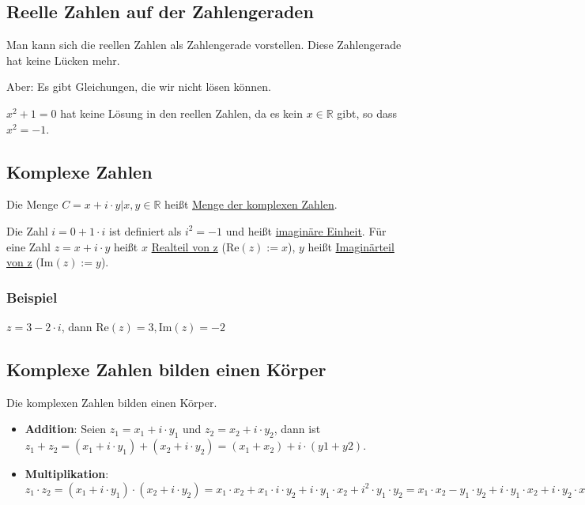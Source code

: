 \subsection{Reelle Zahlen auf der Zahlengeraden}
Man kann sich die reellen Zahlen als Zahlengerade vorstellen. Diese Zahlengerade hat keine Lücken mehr.

\begin{center}
\end{center}

Aber: Es gibt Gleichungen, die wir nicht lösen können.

$x^2 + 1 = 0$ hat keine Lösung in den reellen Zahlen, da es kein $x \in \mathbb{R}$ gibt, so dass $x^2 = -1$.

\subsection{Komplexe Zahlen}
Die Menge $C = {x + i\cdot y | x, y \in \mathbb{R}}$ heißt \underline{Menge der komplexen Zahlen}.

Die Zahl $i = 0 + 1\cdot i$ ist definiert als $i^2 = -1$ und heißt \underline{imaginäre Einheit}. Für eine Zahl $z = x + i\cdot y$ heißt $x$ \underline{Realteil von z} ($\text{Re}(z) := x$), $y$ heißt \underline{Imaginärteil von z} ($\text{Im}(z) := y$).

\subsubsection{Beispiel}
$z = 3 - 2\cdot i$, dann $\text{Re}(z) = 3, \text{Im}(z) = -2$

\subsection{Komplexe Zahlen bilden einen Körper}
Die komplexen Zahlen bilden einen Körper.

\begin{itemize}
\item{\textbf{Addition}: Seien $z_1 = x_1 + i \cdot y_1$ und $z_2 = x_2 + i \cdot y_2$, dann ist $z_1 + z_2 = (x_1 + i \cdot y_1) + (x_2 + i \cdot y_2) = (x_1 + x_2) + i \cdot (y1 + y2)$.}
\item{\textbf{Multiplikation}: $z_1 \cdot z_2 = (x_1 + i \cdot y_1) \cdot (x_2 + i \cdot y_2) = x_1 \cdot x_2 + x_1 \cdot i \cdot y_2 + i \cdot y_1 \cdot x_2 + i^2 \cdot y_1 \cdot y_2 = x_1 \cdot x_2 - y_1 \cdot y_2 + i \cdot y_1 \cdot x_2 + i \cdot y_2 \cdot x_1 = (x_1 \cdot x_2 - y_1 \cdot y_2) + i \cdot (x_1 \cdot y_2 + x_2 \cdot y_1)$}
\end{itemize}

